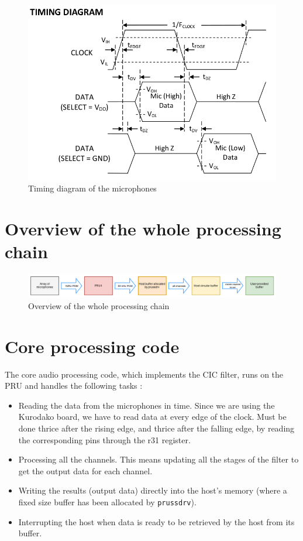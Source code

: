 \documentclass[]{report}
\providecommand{\tightlist}{%
	\setlength{\itemsep}{0pt}\setlength{\parskip}{0pt}}
\begin{document}
\begin{figure}[H]
\centering
\includegraphics[width=0.6\linewidth]{Pictures/timing_diagram.png}
\caption{Timing diagram of the microphones}
\end{figure}


\hypertarget{overview-of-the-whole-processing-chain}{%
\section{Overview of the whole processing
chain}\label{overview-of-the-whole-processing-chain}}

\begin{figure}[H]
\centering
\includegraphics[width=1.0\linewidth]{Pictures/PRU_processing_chain.png}
\caption{Overview of the whole processing chain}
\end{figure}

\hypertarget{core-processing-code}{%
\section{Core processing code}\label{core-processing-code}}

The core audio processing code, which implements the CIC filter, runs on the PRU and handles the following tasks :

\begin{itemize}
\tightlist
\item
  Reading the data from the microphones in time. Since we are using the Kurodako board, we have to read data at every edge of the clock. Must be done thrice after the rising edge, and thrice after the falling edge, by reading the corresponding pins through the r31 register.
\item
  Processing all the channels. This means updating all the stages of the filter to get the output data for each channel.
\item
  Writing the results (output data) directly into the host's memory (where a fixed size buffer has been allocated by \texttt{prussdrv}).
\item
  Interrupting the host when data is ready to be retrieved by the host from its buffer.
\end{itemize}
\end{document}
